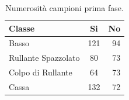 \begin{table}[h!]
	\begin{center}
		\begin{tabular}{l|c|r} %
			\textbf{Classe} & \textbf{Si} & \textbf{No}\\
			\hline
			Basso & 121 & 94\\
			Rullante Spazzolato & 80 & 73\\
			Colpo di Rullante & 64 & 73\\
			Cassa & 132 & 72
		\end{tabular}
		\caption{Numerosità campioni prima fase.}
		\label{tab:numerosità_1}
	\end{center}
\end{table}

